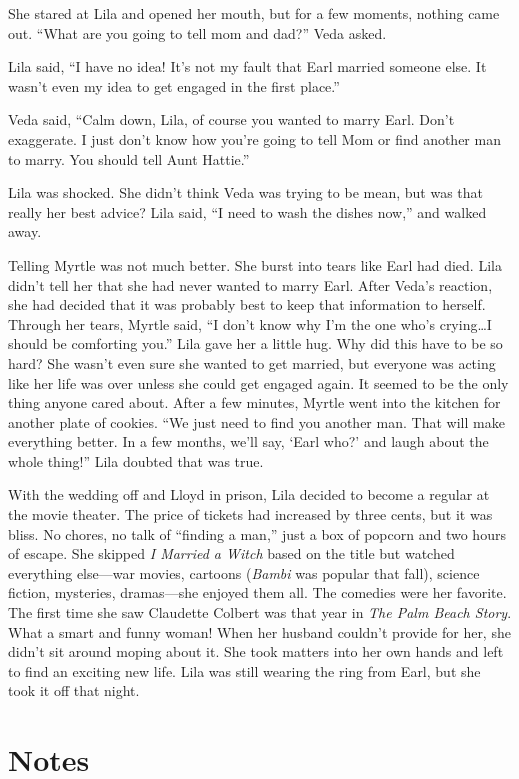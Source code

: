 \documentclass[
  american,
  letterpaper,
]{book}
\begin{document}
She stared at Lila and opened her mouth, but for a few moments, nothing
came out. ``What are you going to tell mom and dad?'' Veda asked.

Lila said, ``I have no idea! It's not my fault that Earl married someone
else. It wasn't even my idea to get engaged in the first place.''

Veda said, ``Calm down, Lila, of course you wanted to marry Earl. Don't
exaggerate. I just don't know how you're going to tell Mom or find
another man to marry. You should tell Aunt Hattie.''

Lila was shocked. She didn't think Veda was trying to be mean, but was
that really her best advice? Lila said, ``I need to wash the dishes
now,'' and walked away.

Telling Myrtle was not much better. She burst into tears like Earl had
died. Lila didn't tell her that she had never wanted to marry Earl.
After Veda's reaction, she had decided that it was probably best to keep
that information to herself. Through her tears, Myrtle said, ``I don't
know why I'm the one who's crying\ldots I should be comforting you.''
Lila gave her a little hug. Why did this have to be so hard? She wasn't
even sure she wanted to get married, but everyone was acting like her
life was over unless she could get engaged again. It seemed to be the
only thing anyone cared about. After a few minutes, Myrtle went into the
kitchen for another plate of cookies. ``We just need to find you another
man. That will make everything better. In a few months, we'll say, `Earl
who?' and laugh about the whole thing!'' Lila doubted that was true.

With the wedding off and Lloyd in prison, Lila decided to become a
regular at the movie theater. The price of tickets had increased by
three cents, but it was bliss. No chores, no talk of ``finding a man,''
just a box of popcorn and two hours of escape. She skipped \emph{I
Married a Witch} based on the title but watched everything else---war
movies, cartoons (\emph{Bambi} was popular that fall), science fiction,
mysteries, dramas---she enjoyed them all. The comedies were her
favorite. The first time she saw Claudette Colbert was that year in
\emph{The Palm Beach Story}. What a smart and funny woman! When her
husband couldn't provide for her, she didn't sit around moping about it.
She took matters into her own hands and left to find an exciting new
life. Lila was still wearing the ring from Earl, but she took it off
that night.

\section{Notes}\label{notes-27}
\end{document}
